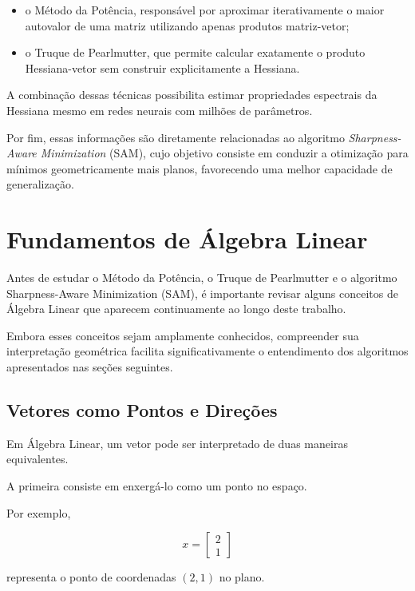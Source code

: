 \documentclass[12pt, a4paper]{article}
\begin{document}
\begin{itemize}
    \item o Método da Potência, responsável por aproximar iterativamente o maior autovalor de uma matriz utilizando apenas produtos matriz-vetor;
    \item o Truque de Pearlmutter, que permite calcular exatamente o produto Hessiana-vetor sem construir explicitamente a Hessiana.
\end{itemize}

A combinação dessas técnicas possibilita estimar propriedades espectrais da Hessiana mesmo em redes neurais com milhões de parâmetros.

Por fim, essas informações são diretamente relacionadas ao algoritmo \textit{Sharpness-Aware Minimization} (SAM), cujo objetivo consiste em conduzir a otimização para mínimos geometricamente mais planos, favorecendo uma melhor capacidade de generalização.

\section{Fundamentos de Álgebra Linear}

Antes de estudar o Método da Potência, o Truque de Pearlmutter e o algoritmo
Sharpness-Aware Minimization (SAM), é importante revisar alguns conceitos de
Álgebra Linear que aparecem continuamente ao longo deste trabalho.

Embora esses conceitos sejam amplamente conhecidos, compreender sua
interpretação geométrica facilita significativamente o entendimento dos
algoritmos apresentados nas seções seguintes.

\subsection{Vetores como Pontos e Direções}

Em Álgebra Linear, um vetor pode ser interpretado de duas maneiras
equivalentes.

A primeira consiste em enxergá-lo como um ponto no espaço.

Por exemplo,

\[
x=
\begin{bmatrix}
2\\
1
\end{bmatrix}
\]

representa o ponto de coordenadas $(2,1)$ no plano.
\end{document}
